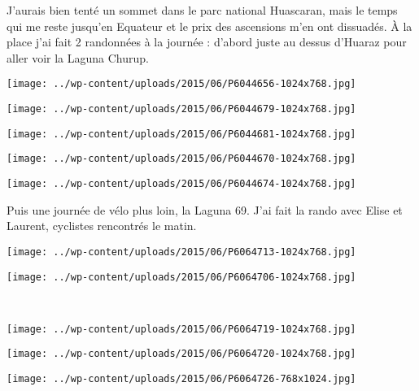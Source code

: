 J'aurais bien tenté un sommet dans le parc national Huascaran, mais le temps qui me reste jusqu'en Equateur et le prix des ascensions m'en ont dissuadés. 
À la place j'ai fait 2 randonnées à la journée : 
d'abord juste au dessus d'Huaraz pour aller voir la Laguna Churup. 
\begin{center} \texttt{[image: ../wp-content/uploads/2015/06/P6044656-1024x768.jpg]} \end{center}
\begin{center} \texttt{[image: ../wp-content/uploads/2015/06/P6044679-1024x768.jpg]} \end{center}
\begin{center} \texttt{[image: ../wp-content/uploads/2015/06/P6044681-1024x768.jpg]} \end{center}
\begin{center} \texttt{[image: ../wp-content/uploads/2015/06/P6044670-1024x768.jpg]} \end{center}
\vfill
\begin{center} \texttt{[image: ../wp-content/uploads/2015/06/P6044674-1024x768.jpg]} \end{center}
\vspace{-\topsep}
\vspace{-0.75mm}
\pagebreak
Puis une journée de vélo plus loin, la Laguna 69. J'ai fait la rando avec Elise et Laurent, cyclistes rencontrés le matin. 
\begin{center} \texttt{[image: ../wp-content/uploads/2015/06/P6064713-1024x768.jpg]} \end{center}
\begin{center} \texttt{[image: ../wp-content/uploads/2015/06/P6064706-1024x768.jpg]} \end{center}
\vspace{-\topsep}
\vspace{-2.75mm}
\pagebreak
~\\
\begin{center} \texttt{[image: ../wp-content/uploads/2015/06/P6064719-1024x768.jpg]} \end{center}
\begin{center} \texttt{[image: ../wp-content/uploads/2015/06/P6064720-1024x768.jpg]} \end{center}
\begin{center} \texttt{[image: ../wp-content/uploads/2015/06/P6064726-768x1024.jpg]} \end{center}
